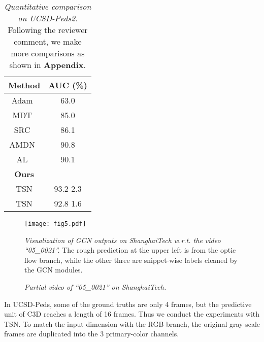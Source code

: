 \documentclass[10pt,twocolumn,letterpaper]{article}
\begin{document}
\begin{table}\centering
  \caption{\emph{Quantitative comparison on UCSD-Peds2}. Following the reviewer comment, we make more comparisons as shown in \textbf{Appendix}.}\label{tab:ucsd}
  \begin{tabular}{cc}
    \hline
    \textbf{Method}  &  \textbf{AUC (\%)}\\
    \hline\hline
    Adam~\cite{adam2008monitors} & 63.0 \\
    MDT~\cite{mahadevan2010anomaly} & 85.0 \\
    SRC~\cite{cong2011sparse} & 86.1  \\
    AMDN~\cite{xu2015deep} & 90.8 \\
    AL~\cite{he2017anomaly} & 90.1 \\
    \hline
    \textbf{Ours}\\
    TSN & 93.2  2.3\\
    TSN & 92.8  1.6\\
    \hline
  \end{tabular}
\end{table}

\begin{figure}[ht]
\centering
\texttt{[image: fig5.pdf]}
\caption{\emph{Visualization of GCN outputs on ShanghaiTech w.r.t. the video ``05\_0021''.} The rough prediction at the upper left is from the optic flow branch, while the other three are snippet-wise labels cleaned by the GCN modules.}
\label{fig:SH_tech_vis}
\end{figure}

\begin{figure}[t]
    \captionsetup[subfigure]{position=bottom}
    \captionsetup[subfloat]{captionskip=0pt}
    \centering  
    
    \caption{\emph{Partial video of ``05\_0021'' on ShanghaiTech.} \color{cyan}{Best viewed in Adobe Reader where (a)-(c) should play as videos.}}
    \label{fig:vis_abvideo}
\end{figure}

In UCSD-Peds, some of the ground truths are only 4 frames, but the predictive unit of C3D reaches a length of 16 frames. Thus we conduct the experiments with TSN. To match the input dimension with the RGB branch, the original gray-scale frames are duplicated into the 3 primary-color channels. 
\end{document}
